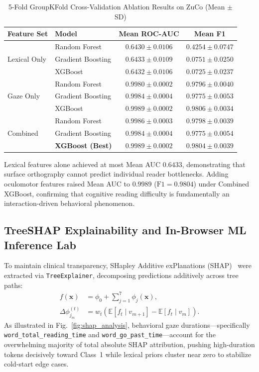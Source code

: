 \documentclass[conference]{IEEEtran}
\begin{document}
\begin{table}[t]
\caption{5-Fold GroupKFold Cross-Validation Ablation Results on ZuCo (Mean $\pm$ SD)}
\centering
\small
\setlength{\tabcolsep}{2pt}
\begin{tabular}{|p{1.35cm}|p{1.45cm}|c|c|}
\hline
\textbf{Feature Set} & \textbf{Model} & \textbf{Mean ROC-AUC} & \textbf{Mean F1} \\
\hline
\multirow{3}{1.35cm}{\centering Lexical Only}
 & Random Forest & $0.6430 \pm 0.0106$ & $0.4254 \pm 0.0747$ \\
 & Gradient Boosting & $0.6433 \pm 0.0109$ & $0.0751 \pm 0.0250$ \\
 & XGBoost & $0.6432 \pm 0.0106$ & $0.0725 \pm 0.0237$ \\
\hline
\multirow{3}{1.35cm}{\centering Gaze Only}
 & Random Forest & $0.9980 \pm 0.0002$ & $0.9796 \pm 0.0040$ \\
 & Gradient Boosting & $0.9984 \pm 0.0004$ & $0.9775 \pm 0.0053$ \\
 & XGBoost & $0.9989 \pm 0.0002$ & $0.9806 \pm 0.0034$ \\
\hline
\multirow{3}{1.35cm}{\centering Combined}
 & Random Forest & $0.9986 \pm 0.0003$ & $0.9798 \pm 0.0039$ \\
 & Gradient Boosting & $0.9984 \pm 0.0004$ & $0.9775 \pm 0.0054$ \\
 & \textbf{XGBoost (Best)} & $\mathbf{0.9989 \pm 0.0002}$ & $\mathbf{0.9804 \pm 0.0039}$ \\
\hline
\end{tabular}
\label{tab:ablation_results}
\end{table}

Lexical features alone achieved at most Mean AUC $0.6433$, demonstrating that surface orthography cannot predict individual reader bottlenecks. Adding oculomotor features raised Mean AUC to $0.9989$ ($\text{F1}=0.9804$) under Combined XGBoost, confirming that cognitive reading difficulty is fundamentally an interaction-driven behavioral phenomenon.

\subsection{TreeSHAP Explainability and In-Browser ML Inference Lab}
To maintain clinical transparency, SHapley Additive exPlanations (SHAP)~\cite{19} were extracted via \texttt{TreeExplainer}, decomposing predictions additively across tree paths:
\begin{equation}
\begin{aligned}
    f(\mathbf{x}) &= \phi_0 + \sum_{j=1}^{7}\phi_j(\mathbf{x}), \\
    \Delta\phi_{j_m}^{(t)}
        &= w_t\!\left(
        \mathbb{E}[f_t \mid v_{m+1}]
        - \mathbb{E}[f_t \mid v_m]\right).
\end{aligned}
\end{equation}
As illustrated in Fig.~\ref{fig:shap_analysis}, behavioral gaze durations---specifically \texttt{word\_total\_reading\_time} and \texttt{word\_go\_past\_time}---account for the overwhelming majority of total absolute SHAP attribution, pushing high-duration tokens decisively toward Class~1 while lexical priors cluster near zero to stabilize cold-start edge cases.
\end{document}
